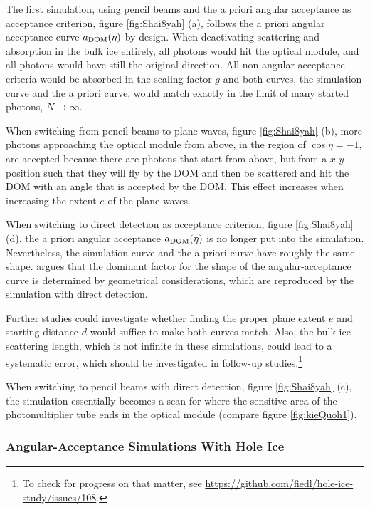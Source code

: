 The first simulation, using pencil beams and the a priori angular
acceptance as acceptance criterion, figure \ref{fig:Shai8yah} (a),
follows the a priori angular acceptance curve \(a_\text{DOM}(\eta)\) by design.
When deactivating scattering and absorption in the bulk ice entirely,
all photons would hit the optical module, and all photons would have
still the original direction. All non-angular acceptance criteria would
be absorbed in the scaling factor \(g\) and both curves, the simulation
curve and the a priori curve, would match exactly in the limit of many
started photons, \(N\rightarrow\infty\).

When switching from pencil beams to plane waves, figure
\ref{fig:Shai8yah} (b), more photons approaching the optical module from
above, in the region of \(\cos \eta = -1\), are accepted because there
are photons that start from above, but from a \(x\)-\(y\) position such
that they will fly by the DOM and then be scattered and hit the DOM with
an angle that is accepted by the DOM. This effect increases when
increasing the extent \(e\) of the plane waves.

When switching to direct detection as acceptance criterion, figure
\ref{fig:Shai8yah} (d), the a priori angular acceptance \(a_\text{DOM}(\eta)\)
is no longer put into the simulation. Nevertheless, the simulation curve
and the a priori curve have roughly the same shape.
\rongen \cite{martindardupdate} argues that the dominant factor for the
shape of the angular-acceptance curve is determined by geometrical
considerations, which are reproduced by the simulation with direct
detection.

Further studies could investigate whether finding the proper plane
extent \(e\) and starting distance \(d\) would suffice to make both
curves match. Also, the bulk-ice scattering length, which is not
infinite in these simulations, could lead to a systematic error, which
should be investigated in follow-up
studies.\footnote{To check for progress on that matter, see \url{https://github.com/fiedl/hole-ice-study/issues/108}.}\followup

When switching to pencil beams with direct detection, figure
\ref{fig:Shai8yah} (c), the simulation essentially becomes a scan for
where the sensitive area of the photomultiplier tube ends in the optical
module (compare figure \ref{fig:kieQuoh1}).

\subsubsection{Angular-Acceptance Simulations With Hole Ice}
\label{sec:angular_acceptance_simulations_with_hole_ice}

